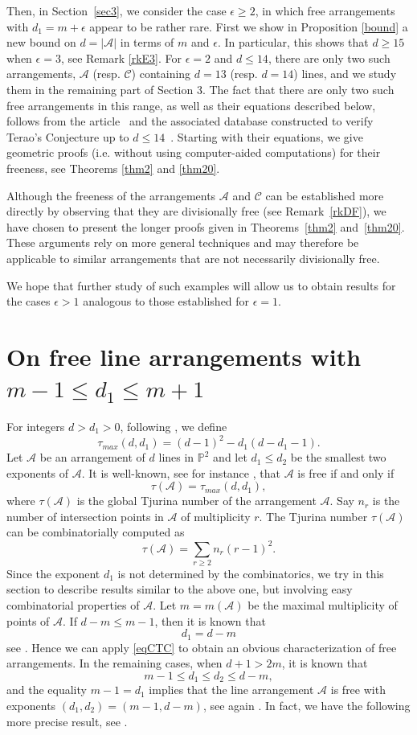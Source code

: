 \documentclass[12pt]{amsart}
\theoremstyle{plain}
\theoremstyle{definition}
\numberwithin{equation}{section}
\newcommand{\A}{{\mathcal A}}
\newcommand{\CC}{{\mathcal C}}
\newcommand{\PP}{\mathbb{P}}
\begin{document}
Then, in Section~\ref{sec3}, we consider the case $\epsilon \geq 2$, in which free arrangements with $d_1 = m + \epsilon$ appear to be rather rare.
First we show in Proposition \ref{bound} a new bound on $d=|\A|$ in terms of $m$ and $\epsilon$. In particular, this shows that $d \geq 15$ when $\epsilon=3$, see Remark \ref{rkE3}.
For $\epsilon =2$ and $d \leq 14$, there are only two such arrangements, $\A$ (resp. $\CC$) containing $d=13$ (resp. $d=14$) lines, and we study them in the remaining part of Section 3.
The fact that there are only two such free arrangements in this range, as well as their equations described below, follows from the article~\cite{BBJKL21} and the associated database \cite{BK} constructed to verify Terao's Conjecture up to $d\le 14$~\cite{BK23}.
Starting with their equations, we give geometric proofs (i.e. without using computer-aided computations) for their freeness, see Theorems \ref{thm2} and \ref{thm20}. 

Although the freeness of the arrangements $\A$ and $\CC$ can be established more directly by observing that they are divisionally free (see Remark~\ref{rkDF}), we have chosen to present the longer proofs given in Theorems~\ref{thm2} and~\ref{thm20}. These arguments rely on more general techniques and may therefore be applicable to similar arrangements that are not necessarily divisionally free. 


We hope that further study of such examples will allow us to obtain results for the cases $\epsilon > 1$ analogous to those established for $\epsilon = 1$.

\section{On free line arrangements with \texorpdfstring{$m-1 \leq d_1 \leq m+1$}{}}\label{sec2} 
 For integers $d > d_1>0$, following \cite{dPCTC}, we define
$$\tau_{max}(d,d_1)=(d-1)^2-d_1(d-d_1-1).$$
Let $\A$ be an arrangement of $d$ lines in $\PP^2$ and let $d_1\leq d_2$ be the smallest two exponents of $\A$. It is well-known, see for instance \cite{Dmax,dPCTC}, that $\A$ is free if and only if
\begin{equation}
\label{eqCTC}
\tau(\A)=\tau_{max}(d,d_1),
\end{equation}
where $\tau(\A)$ is the global Tjurina number of the arrangement $\A$.
Say $n_r$ is the number of intersection points in $\A$ of multiplicity $r$.
The Tjurina number $\tau(\A)$ can be combinatorially computed as
\[
\tau(\A) = \sum_{r\ge 2}n_r(r-1)^2.
\]
Since the exponent $d_1$ is not determined by the combinatorics, we try in this section to describe results similar to the above one, but involving
easy combinatorial properties of $\A$. 
Let $m=m(\A)$ be the maximal multiplicity of points of $\A$. If $d-m \leq m-1$, then it is known that
$$d_1=d-m$$
see \cite{Mich}. Hence we can apply \eqref{eqCTC} to obtain an obvious characterization of free arrangements.
In the remaining cases, when $d+1 >2m$, it is known that
$$m-1 \leq d_1 \leq d_2 \leq d-m,$$
and the equality $m-1=d_1$ implies that the line arrangement $\A$ is free with exponents
$(d_1,d_2)=(m-1,d-m)$, see again \cite{Mich}. In fact, we have the following more precise result, see \cite[Theorem 1.12  (1)]{Der}.
\end{document}
